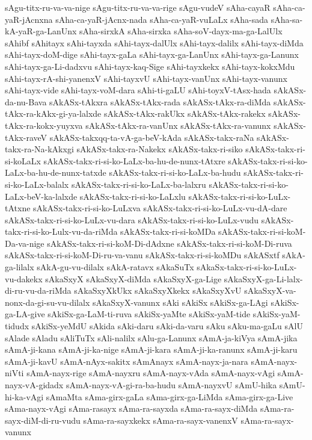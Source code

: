 {sAgu-titx-ru-va-va-nige
sAgu-titx-ru-va-va-rige
sAgu-vudeV
sAha-cayaR
sAha-ca-yaR-jAcnxna
sAha-ca-yaR-jAcnx-nada
sAha-ca-yaR-vuLaLx
sAha-sada
sAha-sa-kA-yaR-ga-LanUnx
sAha-sirxkA
sAha-sirxka
sAha-soV-dayx-ma-ga-LalUlx
sAhibf
sAhitayx
sAhi-tayxda
sAhi-tayx-dalUlx
sAhi-tayx-dalilx
sAhi-tayx-diMda
sAhi-tayx-doM-dige
sAhi-tayx-gaLa
sAhi-tayx-ga-LanUnx
sAhi-tayx-ga-Lanunx
sAhi-tayx-ga-Li-dadxvu
sAhi-tayx-kaq-Sige
sAhi-tayxkekx
sAhi-tayx-kokxMdu
sAhi-tayx-rA-shi-yanenxV
sAhi-tayxvU
sAhi-tayx-vanUnx
sAhi-tayx-vanunx
sAhi-tayx-vide
sAhi-tayx-voM-dara
sAhi-ti-gaLU
sAhi-toyxV-tAsx-hada
sAkASx-da-nu-Bava
sAkASx-tAkxra
sAkASx-tAkx-rada
sAkASx-tAkx-ra-diMda
sAkASx-tAkx-ra-kAkx-gi-ya-lalxde
sAkASx-tAkx-rakUkx
sAkASx-tAkx-rakekx
sAkASx-tAkx-ra-kokx-yuyxva
sAkASx-tAkx-ra-vanUnx
sAkASx-tAkx-ra-vanunx
sAkASx-tAkx-raveV
sAkASx-takxqq-ta-vA-ga-beV-kAda
sAkASx-takx-raNa
sAkASx-takx-ra-Na-kAkxgi
sAkASx-takx-ra-Nakekx
sAkASx-takx-ri-siko
sAkASx-takx-ri-si-koLaLx
sAkASx-takx-ri-si-ko-LaLx-ba-hu-de-nunx-tAtxre
sAkASx-takx-ri-si-ko-LaLx-ba-hu-de-nunx-tatxde
sAkASx-takx-ri-si-ko-LaLx-ba-hudu
sAkASx-takx-ri-si-ko-LaLx-balalx
sAkASx-takx-ri-si-ko-LaLx-ba-lalxru
sAkASx-takx-ri-si-ko-LaLx-beV-ka-lalxde
sAkASx-takx-ri-si-ko-LaLxlu
sAkASx-takx-ri-si-ko-LuLx-tAtxne
sAkASx-takx-ri-si-ko-LuLxva
sAkASx-takx-ri-si-ko-LuLx-vu-dA-dare
sAkASx-takx-ri-si-ko-LuLx-vu-dara
sAkASx-takx-ri-si-ko-LuLx-vudu
sAkASx-takx-ri-si-ko-Lulx-vu-da-riMda
sAkASx-takx-ri-si-koMDa
sAkASx-takx-ri-si-koM-Da-va-nige
sAkASx-takx-ri-si-koM-Di-dAdxne
sAkASx-takx-ri-si-koM-Di-ruva
sAkASx-takx-ri-si-koM-Di-ru-va-vanu
sAkASx-takx-ri-si-koMDu
sAkASxtf
sAkA-ga-lilalx
sAkA-gu-vu-dilalx
sAkA-ratavx
sAkaSuTx
sAkaSx-takx-ri-si-ko-LuLx-vu-dakekx
sAkaSxyX
sAkaSxyX-diMda
sAkaSxyX-ga-Lige
sAkaSxyX-ga-Li-lalx-di-ru-vu-da-riMda
sAkaSxyXkUkx
sAkaSxyXkekx
sAkaSxyXvU
sAkaSxyX-va-nonx-da-gi-su-vu-dilalx
sAkaSxyX-vanunx
sAki
sAkiSx
sAkiSx-ga-LAgi
sAkiSx-ga-LA-give
sAkiSx-ga-LaM-ti-ruva
sAkiSx-yaMte
sAkiSx-yaM-tide
sAkiSx-yaM-tidudx
sAkiSx-yeMdU
sAkida
sAki-daru
sAki-da-varu
sAku
sAku-ma-gaLu
sAlU
sAlade
sAladu
sAliTuTx
sAli-nalilx
sAlu-ga-Lanunx
sAmA-ja-kiVya
sAmA-jika
sAmA-ji-kana
sAmA-ji-ka-nige
sAmA-ji-kara
sAmA-ji-ka-ranunx
sAmA-ji-karu
sAmA-ji-kavU
sAmA-nAyx-sakitx
sAmAnayx
sAmA-nayx-ja-nara
sAmA-nayx-niVti
sAmA-nayx-rige
sAmA-nayxru
sAmA-nayx-vAda
sAmA-nayx-vAgi
sAmA-nayx-vA-gidadx
sAmA-nayx-vA-gi-ra-ba-hudu
sAmA-nayxvU
sAmU-hika
sAmU-hi-ka-vAgi
sAmaMta
sAma-girx-gaLa
sAma-girx-ga-LiMda
sAma-girx-ga-Live
sAma-nayx-vAgi
sAma-rasayx
sAma-ra-sayxda
sAma-ra-sayx-diMda
sAma-ra-sayx-diM-di-ru-vudu
sAma-ra-sayxkekx
sAma-ra-sayx-vanenxV
sAma-ra-sayx-vanunx
}
